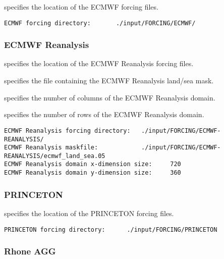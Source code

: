  
  specifies the location of the ECMWF
 forcing files.
 

 \begin{Verbatim}[frame=single]
ECMWF forcing directory:       ./input/FORCING/ECMWF/
 \end{Verbatim}

 
 \subsubsection{ECMWF Reanalysis} \label{sssec:forcings_ecmwf_reanalysis}
 

 
  specifies the location of
 the ECMWF Reanalysis forcing files.

  specifies the file containing
 the ECMWF Reanalysis land/sea mask.

  specifies the 
 number of columns of the ECMWF Reanalysis domain.

  specifies the 
 number of rows of the ECMWF Reanalysis domain.
 

 \begin{Verbatim}[frame=single]
ECMWF Reanalysis forcing directory:   ./input/FORCING/ECMWF-REANALYSIS/
ECMWF Reanalysis maskfile:            ./input/FORCING/ECMWF-REANALYSIS/ecmwf_land_sea.05
ECMWF Reanalysis domain x-dimension size:     720
ECMWF Reanalysis domain y-dimension size:     360
 \end{Verbatim}


 
 \subsubsection{PRINCETON} \label{sssec:forcings_princeton}
 

 
  specifies the location of the
 PRINCETON forcing files.
 

 \begin{Verbatim}[frame=single]
PRINCETON forcing directory:      ./input/FORCING/PRINCETON
 \end{Verbatim}

 
 \subsubsection{Rhone AGG} \label{sssec:forcings_rhone}
 

